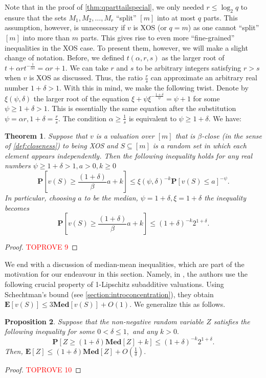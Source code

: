 \documentclass[11pt]{article}%
\newtheorem{theorem}{Theorem}
\newtheorem{proposition}[theorem]{Proposition}
\numberwithin{theorem}{subsection}
\newcommand{\prob}{\mathbf{P}}
\newcommand{\median}{\mathbf{Med}}
\newcommand{\expect}{\mathbf{E}}
\begin{document}
\noindent
Note that in the proof of \cref{thm:qparttailspecial}, we only needed $r\le \log_2 q$ to ensure that the sets $M_1, M_2, \ldots, M_r$ ``split'' $[m]$ into at most $q$ parts. This assumption, however, is unnecessary if $v$ is XOS (or $q = m$) as one cannot ``split'' $[m]$ into more than $m$ parts. This gives rise to even more ``fine-grained'' inequalities in the XOS case. To present them, however, we will make a slight change of notation. Before, we defined $t(\alpha, r,s)$ as the larger root of $t + \alpha r t^{-\frac{1}{\alpha s}} = \alpha r + 1.$
We can take $r$ and $s$ to be arbitrary integers satisfying $r>s$ when $v$ is XOS as discussed. Thus, the ratio $\frac{r}{s}$ can approximate an arbitrary real number $1+ \delta > 1.$ With this in mind, we make the following twist. Denote by $\xi(\psi, \delta)$ the larger root of the equation $\xi + \psi \xi^{-\frac{1+\delta}{\psi}} = \psi+1$ for some $\psi \ge 1+\delta >1.$ This is essentially the same equation after the substitution $\psi =\alpha r, 1+ \delta = \frac{r}{s}.$ The condition $\alpha \ge \frac{1}{s}$ is equivalent to $\psi \ge 1+\delta.$
We have:

\begin{theorem}
\label{thm:tailboundxos}
    Suppose that $v$ is a valuation over $[m]$ that is $\beta$-close (in the sense of \cref{def:closeness}) to being XOS and $S\subseteq [m]$ is a random set in which each element appears independently. Then the following inequality holds for any real numbers $\psi\ge 1+\delta>1,a>0, k\ge 0$
    $$
    \prob[v(S)\ge \frac{(1+\delta)}{\beta}a+k]\le 
    \xi(\psi, \delta)^{-k}\prob[v(S)\le a]^{-\psi}.
    $$
    In particular, choosing $a$ to be the median, $\psi = 1+\delta,\xi = 1+\delta$ the inequality becomes
    $$
    \prob[v(S)\ge \frac{(1+\delta)}{\beta}a+k]\le 
    \left(1+\delta\right)^{-k}2^{1+\delta}.
    $$
\end{theorem}
\begin{proof}\textcolor{red}{TOPROVE 9}\end{proof}


\noindent
We end with a discussion of median-mean inequalities, which are part of the motivation for our endeavour in this section. Namely, in \cite{RubinsteinW18}, the authors use the following crucial property of 1-Lipschitz subadditive valuations. Using Schechtman's bound (see \cref{section:introconcentration}), they obtain
$\expect[v(S)]\le 
3\median[v(S)] + O(1)
.$ We generalize this as follows.

\begin{proposition}
\label{prop:mediantomean}
Suppose that the non-negative random variable $Z$ satisfies the following inequality for some $0<\delta\le 1,$ and any $k >0.$
$$
\prob[Z\ge (1 + \delta)\median[Z] + k]\le 
(1+\delta)^{-k}2^{1+\delta}.
$$
Then, $\expect[Z]\le (1 + \delta)\median[Z] + O(\frac{1}{\delta}).$
\end{proposition}
\begin{proof}\textcolor{red}{TOPROVE 10}\end{proof}
\end{document}
